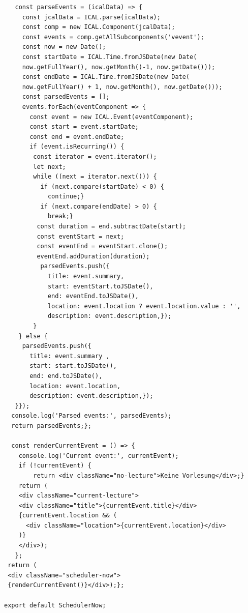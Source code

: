 \begin{lstlisting}
   const parseEvents = (icalData) => {
     const jcalData = ICAL.parse(icalData);
     const comp = new ICAL.Component(jcalData);
     const events = comp.getAllSubcomponents('vevent');
     const now = new Date();
     const startDate = ICAL.Time.fromJSDate(new Date(
     now.getFullYear(), now.getMonth()-1, now.getDate()));
     const endDate = ICAL.Time.fromJSDate(new Date(
     now.getFullYear() + 1, now.getMonth(), now.getDate()));
     const parsedEvents = [];
     events.forEach(eventComponent => {
       const event = new ICAL.Event(eventComponent);
       const start = event.startDate;
       const end = event.endDate;
       if (event.isRecurring()) {
       	const iterator = event.iterator();
       	let next;
       	while ((next = iterator.next())) {
       	  if (next.compare(startDate) < 0) {
       	  	continue;}
          if (next.compare(endDate) > 0) {
          	break;}
         const duration = end.subtractDate(start);
         const eventStart = next;
         const eventEnd = eventStart.clone();
         eventEnd.addDuration(duration);
          parsedEvents.push({
            title: event.summary,
            start: eventStart.toJSDate(),
            end: eventEnd.toJSDate(),
            location: event.location ? event.location.value : '',
            description: event.description,});
        }
    } else {
     parsedEvents.push({
       title: event.summary ,
       start: start.toJSDate(),
       end: end.toJSDate(),
       location: event.location,
       description: event.description,});
   }});
  console.log('Parsed events:', parsedEvents);
  return parsedEvents;};

  const renderCurrentEvent = () => {
    console.log('Current event:', currentEvent);
    if (!currentEvent) {
    	return <div className="no-lecture">Keine Vorlesung</div>;}
    return (
    <div className="current-lecture">
    <div className="title">{currentEvent.title}</div>
    {currentEvent.location && (
      <div className="location">{currentEvent.location}</div>
	)}
    </div>);
   };
 return (
 <div className="scheduler-now">
 {renderCurrentEvent()}</div>);};

export default SchedulerNow;
\end{lstlisting}

